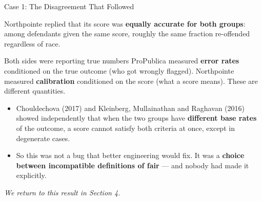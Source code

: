 
\begin{frame}{Case 1: The Disagreement That Followed}

    Northpointe replied that its score was \textbf{equally accurate for both groups}: among
    defendants given the same score, roughly the same fraction re-offended regardless of race.

    \vspace{0.8em}

    \begin{block}{Both sides were reporting true numbers}
        ProPublica measured \textbf{error rates} conditioned on the true outcome
        (who got wrongly flagged). Northpointe measured \textbf{calibration} conditioned on the
        score (what a score means). These are different quantities.
    \end{block}

    \vspace{0.8em}

    \begin{itemize}
        \setlength\itemsep{0.4em}
        \item Chouldechova (2017) and Kleinberg, Mullainathan and Raghavan (2016) showed
              independently that when the two groups have \textbf{different base rates} of the
              outcome, a score cannot satisfy both criteria at once, except in degenerate cases.
        \item So this was not a bug that better engineering would fix. It was a
              \textbf{choice between incompatible definitions of fair} --- and nobody had made it
              explicitly.
    \end{itemize}

    \vspace{0.5em}
    \centering
    \textit{We return to this result in Section 4.}
\end{frame}
